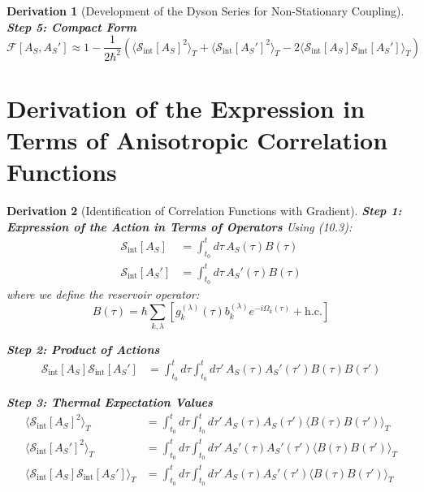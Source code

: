 \documentclass[10pt, a4paper]{article}
\newtheorem{derivation}{Derivation}
\begin{document}
\begin{derivation}[Development of the Dyson Series for Non-Stationary Coupling]
\textbf{Step 5: Compact Form}
\begin{equation}
\mathcal{F}[A_S, A_S'] \approx 1 - \frac{1}{2\hbar^2} \left( \langle \mathcal{S}_{\text{int}}[A_S]^2 \rangle_T + \langle \mathcal{S}_{\text{int}}[A_S']^2 \rangle_T - 2\langle \mathcal{S}_{\text{int}}[A_S] \mathcal{S}_{\text{int}}[A_S'] \rangle_T \right)
\tag{12.8}
\end{equation}
\end{derivation}

\section{Derivation of the Expression in Terms of Anisotropic Correlation Functions}

\begin{derivation}[Identification of Correlation Functions with Gradient]
\textbf{Step 1: Expression of the Action in Terms of Operators}
Using (10.3):
\begin{align}
\mathcal{S}_{\text{int}}[A_S] &= \int_{t_0}^{t} d\tau \, A_S(\tau) B(\tau)
\tag{13.1} \\
\mathcal{S}_{\text{int}}[A_S'] &= \int_{t_0}^{t} d\tau \, A_S'(\tau) B(\tau)
\tag{13.2}
\end{align}
where we define the reservoir operator:
\begin{equation}
B(\tau) = \hbar \sum_{k,\lambda} \left[ g_{k}^{(\lambda)}(\tau) b_{k}^{(\lambda)} e^{-i\Omega_k(\tau)} + \text{h.c.} \right]
\tag{13.3}
\end{equation}

\textbf{Step 2: Product of Actions}
\begin{align}
\mathcal{S}_{\text{int}}[A_S] \mathcal{S}_{\text{int}}[A_S'] &= \int_{t_0}^{t} d\tau \int_{t_0}^{t} d\tau' \, A_S(\tau) A_S'(\tau') B(\tau) B(\tau')
\tag{13.4}
\end{align}

\textbf{Step 3: Thermal Expectation Values}
\begin{align}
\langle \mathcal{S}_{\text{int}}[A_S]^2 \rangle_T &= \int_{t_0}^{t} d\tau \int_{t_0}^{t} d\tau' \, A_S(\tau) A_S(\tau') \langle B(\tau) B(\tau') \rangle_T
\tag{13.5} \\
\langle \mathcal{S}_{\text{int}}[A_S']^2 \rangle_T &= \int_{t_0}^{t} d\tau \int_{t_0}^{t} d\tau' \, A_S'(\tau) A_S'(\tau') \langle B(\tau) B(\tau') \rangle_T
\tag{13.6} \\
\langle \mathcal{S}_{\text{int}}[A_S] \mathcal{S}_{\text{int}}[A_S'] \rangle_T &= \int_{t_0}^{t} d\tau \int_{t_0}^{t} d\tau' \, A_S(\tau) A_S'(\tau') \langle B(\tau) B(\tau') \rangle_T
\tag{13.7}
\end{align}


\end{derivation}
\end{document}
